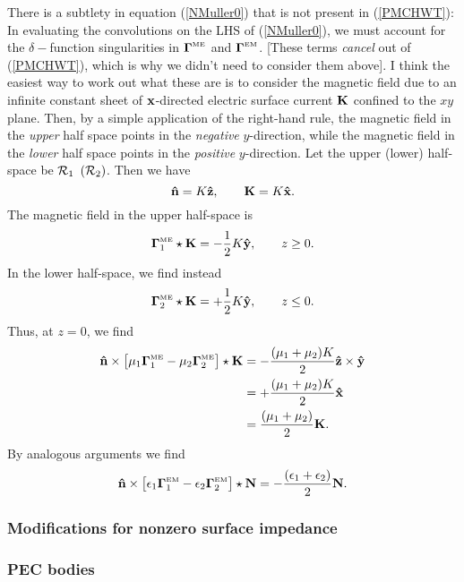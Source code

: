 There is a subtlety in equation (\ref{NMuller0})
that is not present in (\ref{PMCHWT}):
In evaluating the convolutions on the LHS of (\ref{NMuller0}),
we must account for the $\delta-$function singularities in 
$\boldsymbol{\Gamma}^{\hbox{\tiny{ME}}}$ and $\boldsymbol{\Gamma}^{\hbox{\tiny{EM}}}$. [These terms 
\textit{cancel} out of (\ref{PMCHWT}), which is why we
didn't need to consider them above]. I think the easiest
way to work out what these are is to consider the 
magnetic field due to an infinite constant sheet 
of $\mathbf{x}$-directed electric surface current 
$\mathbf{K}$ confined to the $xy$ plane. Then, by a simple 
application of the right-hand rule, the magnetic 
field in the \textit{upper} half space points in the 
\textit{negative} $y$-direction, 
while the magnetic field in the \textit{lower} half 
space points in the \textit{positive} $y$-direction.
Let the upper (lower) half-space
be $\mathcal{R}_1$ $(\mathcal{R}_2)$. Then we have 
$$ \mathbf{\hat n} = K \mathbf{\hat z}, \qquad \mathbf{K}= K \mathbf{\hat x}. $$
The magnetic field in the upper half-space is
$$ \boldsymbol{\Gamma}^{\hbox{\tiny{ME}}}_1 \star \mathbf{K} 
   = -\frac{1}{2}K \mathbf{\hat y}, \qquad  z\ge 0.
$$
In the lower half-space, we find instead
$$ \boldsymbol{\Gamma}^{\hbox{\tiny{ME}}}_2 \star \mathbf{K} 
   = +\frac{1}{2}K \mathbf{\hat y}, \qquad  z\le 0.
$$
Thus, at $z=0$, we find
\begin{align*}
 \mathbf{\hat n}\times
   \big[\mu_1 \boldsymbol{\Gamma}^{\hbox{\tiny{ME}}}_1 - \mu_2 \boldsymbol{\Gamma}^{\hbox{\tiny{ME}}}_2 \big]\star \mathbf{K}
   &=-\frac{(\mu_1 + \mu_2)K}{2}\mathbf{\hat z} \times \mathbf{\hat y}
\\
   &=+\frac{(\mu_1 + \mu_2)K}{2}\mathbf{\hat x}
\\
   &=\frac{(\mu_1 + \mu_2)}{2}\mathbf{K}.
\end{align*}
By analogous arguments we find 
$$
 \mathbf{\hat n}\times
   \big[\epsilon_1 \boldsymbol{\Gamma}^{\hbox{\tiny{EM}}}_1 - \epsilon_2 \boldsymbol{\Gamma}^{\hbox{\tiny{EM}}}_2 \big]\star \mathbf{N}
   =-\frac{(\epsilon_1 + \epsilon_2)}{2}\mathbf{N}.
$$

\subsubsection{Modifications for nonzero surface impedance}

\medskip

\subsubsection*{PEC bodies} 


